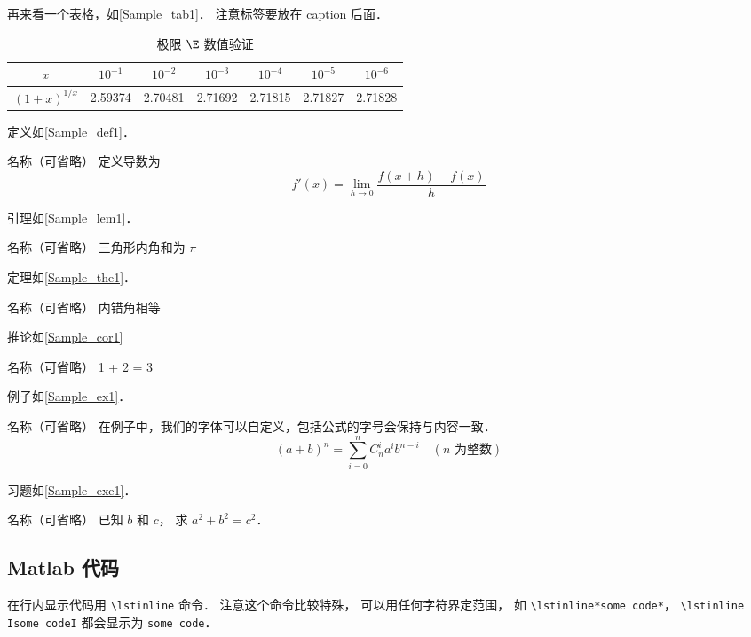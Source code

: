再来看一个表格，如\autoref{Sample_tab1}． 注意标签要放在 caption 后面．
\begin{table}[ht]
\centering
\caption{极限 $\E$ 数值验证}\label{Sample_tab1}
\begin{tabular}{|c|c|c|c|c|c|c|}
\hline
$x$ & ${10^{ - 1}}$ & ${10^{ - 2}}$ & ${10^{ - 3}}$ & ${10^{ - 4}}$ & ${10^{ - 5}}$ & ${10^{ - 6}}$ \\
\hline
$(1 + x)^{1/x}$ & 2.59374 & 2.70481 & 2.71692 & 2.71815 & 2.71827 & 2.71828 \\
\hline
\end{tabular}
\end{table}

定义如\autoref{Sample_def1}．
\begin{definition}{名称（可省略）}\label{Sample_def1}
 定义导数为
\begin{equation}
f'(x) = \lim_{h \to 0} \frac{f(x + h) - f(x)}{h}
\end{equation}
\end{definition}

引理如\autoref{Sample_lem1}．
\begin{lemma}{名称（可省略）}\label{Sample_lem1}
三角形内角和为 $\pi$
\end{lemma}

定理如\autoref{Sample_the1}．
\begin{theorem}{名称（可省略）}\label{Sample_the1}
内错角相等
\end{theorem}

推论如\autoref{Sample_cor1}
\begin{corollary}{名称（可省略）}\label{Sample_cor1}
1 + 2 = 3
\end{corollary}

例子如\autoref{Sample_ex1}． 
\begin{example}{名称（可省略）}\label{Sample_ex1}
在例子中，我们的字体可以自定义，包括公式的字号会保持与内容一致．
\begin{equation}
(a+b)^n = \sum_{i=0}^n C_n^i a^i b^{n-i} \quad (\text{$n$ 为整数})
\end{equation}
\end{example}

习题如\autoref{Sample_exe1}． 
\begin{exercise}{名称（可省略）}\label{Sample_exe1}
已知 $b$ 和 $c$， 求 $a^2 + b^2 = c^2$．
\end{exercise}

\subsection{Matlab 代码}
在行内显示代码用 \lstinline|\lstinline| 命令． 注意这个命令比较特殊， 可以用任何字符界定范围， 如 \lstinline|\lstinline*some code*|， \lstinline|\lstinline Isome codeI| 都会显示为 \lstinline|some code|．
